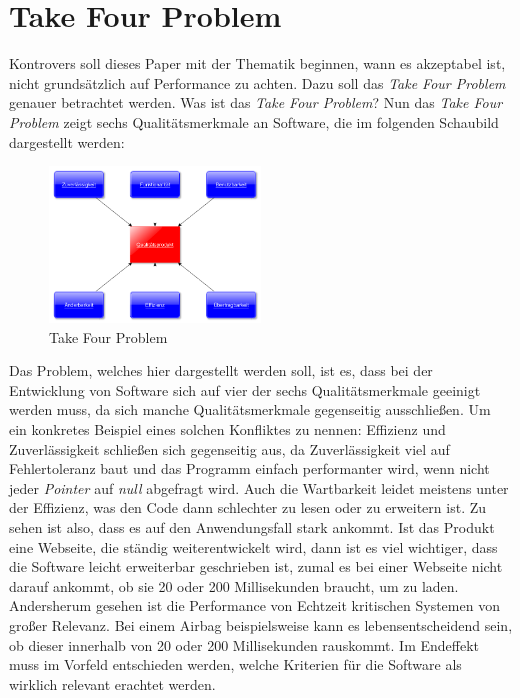\section{Take Four Problem}\label{sec:takeforproblem}
Kontrovers soll dieses Paper mit der Thematik beginnen, wann es akzeptabel ist, nicht
grundsätzlich auf Performance zu achten. Dazu soll das \emph{Take Four Problem} genauer
betrachtet werden. Was ist das \emph{Take Four Problem}? Nun das \emph{Take Four Problem} zeigt
sechs Qualitätsmerkmale an Software, die im folgenden Schaubild dargestellt werden:

\begin{figure}[h]
    \centering
    \includegraphics[width=0.5\textwidth]{bilder/ISO2}
    \caption[T4P]{Take Four Problem}
    \label{img:T4P}
\end{figure}

Das Problem, welches hier dargestellt werden soll, ist es, dass bei der Entwicklung von Software
sich auf vier der sechs Qualitätsmerkmale geeinigt werden muss, da sich manche Qualitätsmerkmale
gegenseitig ausschließen. Um ein konkretes Beispiel eines solchen Konfliktes zu nennen: Effizienz
und Zuverlässigkeit schließen sich gegenseitig aus, da Zuverlässigkeit viel auf Fehlertoleranz
baut und das Programm einfach performanter wird, wenn nicht jeder \emph{Pointer} auf \emph{null}
abgefragt wird. Auch die Wartbarkeit leidet meistens unter der Effizienz, was den Code dann schlechter zu lesen oder zu erweitern ist.
\newline
\newline
Zu sehen ist also, dass es auf den Anwendungsfall stark ankommt. Ist das Produkt eine Webseite,
die ständig weiterentwickelt wird, dann ist es viel wichtiger, dass die Software leicht
erweiterbar geschrieben ist, zumal es bei einer Webseite nicht darauf ankommt, ob sie 20 oder 200
Millisekunden braucht, um zu laden.
\newline
\newline
Andersherum gesehen ist die Performance von Echtzeit kritischen Systemen von großer Relevanz. Bei
einem Airbag beispielsweise kann es lebensentscheidend sein, ob dieser innerhalb von 20 oder 200
Millisekunden rauskommt. Im Endeffekt muss im Vorfeld entschieden werden, welche Kriterien für
die Software als wirklich relevant erachtet werden.